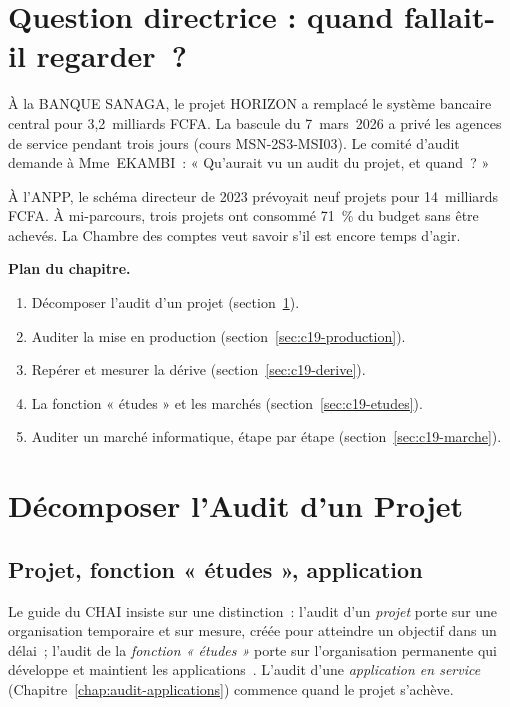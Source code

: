 \bigskip

\section*{Question directrice : quand fallait-il regarder~?}

À la BANQUE SANAGA, le projet HORIZON a remplacé le système bancaire
central pour 3,2~milliards FCFA. La bascule du 7~mars~2026 a privé les
agences de service pendant trois jours (cours MSN-2S3-MSI03). Le comité
d'audit demande à Mme~EKAMBI~: « Qu'aurait vu un audit du projet, et
quand~? »

À l'ANPP, le schéma directeur de 2023 prévoyait neuf projets pour
14~milliards FCFA. À mi-parcours, trois projets ont consommé 71~\% du
budget sans être achevés. La Chambre des comptes veut savoir s'il est
encore temps d'agir.

\medskip
\textbf{Plan du chapitre.}
\begin{enumerate}
    \item Décomposer l'audit d'un projet (section~\ref{sec:c19-decomposer}).
    \item Auditer la mise en production (section~\ref{sec:c19-production}).
    \item Repérer et mesurer la dérive (section~\ref{sec:c19-derive}).
    \item La fonction « études » et les marchés (section~\ref{sec:c19-etudes}).
    \item Auditer un marché informatique, étape par étape (section~\ref{sec:c19-marche}).
\end{enumerate}

\separateur

\section{Décomposer l'Audit d'un Projet}
\label{sec:c19-decomposer}

\subsection{Projet, fonction « études », application}

Le guide du CHAI insiste sur une distinction~: l'audit d'un \emph{projet}
porte sur une organisation temporaire et sur mesure, créée pour atteindre
un objectif dans un délai~; l'audit de la \emph{fonction « études »} porte
sur l'organisation permanente qui développe et maintient les
applications~\cite{chai2014guide}. L'audit d'une \emph{application en
service} (Chapitre~\ref{chap:audit-applications}) commence quand le projet
s'achève.

